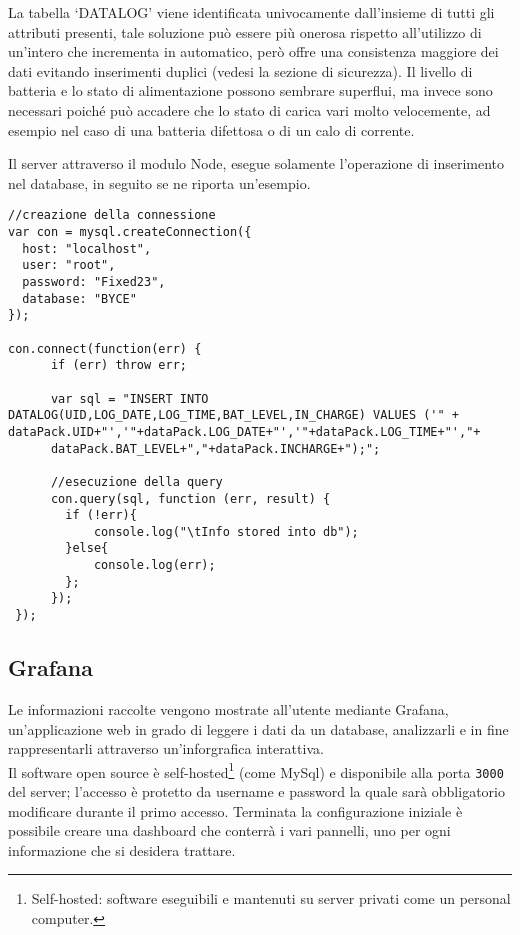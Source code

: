 \documentclass[target=bach]{thud}
\begin{document}
                La tabella `DATALOG' viene identificata univocamente dall'insieme di tutti gli attributi presenti, tale soluzione può essere più onerosa rispetto all'utilizzo di un'intero che incrementa in automatico, però offre una consistenza maggiore dei dati evitando inserimenti duplici (vedesi la sezione di sicurezza).
                Il livello di batteria e lo stato di alimentazione possono sembrare superflui, ma invece sono necessari poiché può accadere che lo stato di carica vari molto velocemente, ad esempio nel caso di una batteria difettosa o di un calo di corrente.

                Il server attraverso il modulo Node, esegue solamente l'operazione di inserimento nel database, in seguito se ne riporta un'esempio.
\begin{lstlisting}
//creazione della connessione
var con = mysql.createConnection({
  host: "localhost",
  user: "root",
  password: "Fixed23",
  database: "BYCE"
});

con.connect(function(err) {
      if (err) throw err;

      var sql = "INSERT INTO DATALOG(UID,LOG_DATE,LOG_TIME,BAT_LEVEL,IN_CHARGE) VALUES ('" + dataPack.UID+"','"+dataPack.LOG_DATE+"','"+dataPack.LOG_TIME+"',"+
      dataPack.BAT_LEVEL+","+dataPack.INCHARGE+");";

      //esecuzione della query
      con.query(sql, function (err, result) {
        if (!err){
            console.log("\tInfo stored into db");
        }else{
            console.log(err);
        };
      });
 });

\end{lstlisting}
            \subsection{Grafana}

                    Le informazioni raccolte vengono mostrate all'utente mediante Grafana, un'applicazione web in grado di leggere i dati da un database, analizzarli e in fine rappresentarli attraverso un'inforgrafica interattiva.\\
                    Il software open source è self-hosted\footnote[16]{Self-hosted: software eseguibili e mantenuti su server privati come un personal computer.} (come MySql) e disponibile alla porta \texttt{3000} del server; l'accesso è protetto da username e password la quale sarà obbligatorio modificare durante il primo accesso.
                    Terminata la configurazione iniziale è possibile creare una dashboard che conterrà i vari pannelli, uno per ogni informazione che si desidera trattare.
\end{document}
